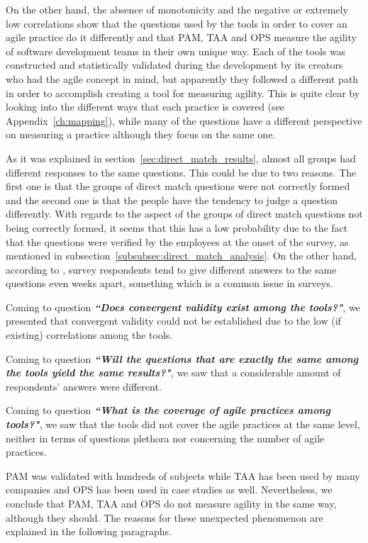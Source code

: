 On the other hand, the absence of monotonicity and the negative or extremely low correlations show that the questions used by the tools in order to cover an agile practice do it differently and that \ac{PAM}, \ac{TAA} and \ac{OPS} measure the agility of software development teams in their own unique way. Each of the tools was constructed and statistically validated during the development by its creators who had the agile concept in mind, but apparently they followed a different path in order to accomplish creating a tool for measuring agility. This is quite clear by looking into the different ways that each practice is covered (see Appendix~\ref{ch:mapping}), while many of the questions have a different perspective on measuring a practice although they focus on the same one. 

As it was explained in section~\ref{sec:direct_match_results}, almost all groups had different responses to the same questions. This could be due to two reasons. The first one is that the groups of direct match questions were not correctly formed and the second one is that the people have the tendency to judge a question differently. With regards to the aspect of the groups of direct match questions not being correctly formed, it seems that this has a low probability due to the fact that the questions were verified by the employees at the onset of the survey, as mentioned in subsection~\ref{subsubsec:direct_match_analysis}. On the other hand, according to \citet{Lacy}, survey respondents tend to give different answers to the same questions even weeks apart, something which is a common issue in surveys.

Coming to question \textbf{\textit{``Does convergent validity exist among the tools?"}}, we presented that convergent validity could not be established due to the low (if existing) correlations among the tools.

Coming to question \textbf{\textit{``Will the questions that are exactly the same among the tools yield the same results?"}}, we saw that a considerable amount of respondents' answers were different.

Coming to question \textbf{\textit{``What is the coverage of agile practices among tools?"}}, we saw that the tools did not cover the agile practices at the same level, neither in terms of questions plethora nor concerning the number of agile practices.

\ac{PAM} was validated with hundreds of subjects while \ac{TAA} has been used by many companies and \ac{OPS} has been used in case studies as well. Nevertheless, we conclude that \ac{PAM}, \ac{TAA} and \ac{OPS} do not measure agility in the same way, although they should. The reasons for these unexpected phenomenon are explained in the following paragraphs.

